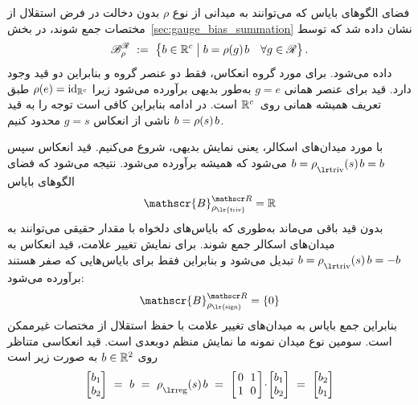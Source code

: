فضای الگوهای بایاس که می‌توانند به میدانی از نوع $\rho$ بدون دخالت در فرض استقلال از مختصات جمع شوند، در بخش~\ref{sec:gauge_bias_summation} نشان داده شد که توسط
\begin{align}
	\mathscr{B}^{\mathscr{R}}_\rho\ :=\ \big\{ b \in\mathbb{R}^c \;\big|\; b = \rho(g)\mkern2mu b\ \ \ \forall g\in \mathscr{R} \big\} \,.
\end{align}
داده می‌شود.
برای مورد گروه انعکاس، فقط دو عنصر گروه و بنابراین دو قید وجود دارد.
قید برای عنصر همانی $g=e$ به‌طور بدیهی برآورده می‌شود زیرا $\rho(e) = \mathrm{id}_{\mathbb{R}^c}$ طبق تعریف همیشه همانی روی~$\mathbb{R}^c$ است.
در ادامه بنابراین کافی است توجه را به قید $b = \rho(s)\mkern2mu b$ ناشی از انعکاس $g=s$ محدود کنیم.

با مورد میدان‌های اسکالر، یعنی نمایش بدیهی، شروع می‌کنیم.
قید انعکاس سپس $b = \rhotriv(s)\mkern2mu b = b$ می‌شود که همیشه برآورده می‌شود.
نتیجه می‌شود که فضای الگوهای بایاس
\begin{align}
	\mathscr{B}^{\Flip}_{\scalebox{.8}{$\rho_{{\textup{\lr{triv}}}}$}} = \R
\end{align}
بدون قید باقی می‌ماند به‌طوری که بایاس‌های دلخواه با مقدار حقیقی می‌توانند به میدان‌های اسکالر جمع شوند.
برای نمایش تغییر علامت، قید انعکاس به $b = \rhotriv(s)\, b = -b$ تبدیل می‌شود و بنابراین فقط برای بایاس‌هایی که صفر هستند برآورده می‌شود:
\begin{align}
	\mathscr{B}^{\Flip}_{\scalebox{.8}{$\rho_{{\textup{\lr{sign}}}}$}} = \{0\}
\end{align}
بنابراین جمع بایاس به میدان‌های تغییر علامت با حفظ استقلال از مختصات غیرممکن است.
سومین نوع میدان نمونه ما نمایش منظم دوبعدی است.
قید انعکاسی متناظر روی $b\in\mathbb{R}^2$ به صورت زیر است
\begin{align}
	\begin{bmatrix} b_1 \\ b_2 \end{bmatrix}
	\ =\ 
	b
	\ =\ 
	\rhoreg(s)\mkern2mu b
	\ =\ 
	\begin{bmatrix} \hspace{1.5pt}
		0 &\mkern-7mu 1 \hspace*{1.5pt} \\ \hspace{1.5pt} 1 &\mkern-7mu 0 \hspace*{1.5pt}
	\end{bmatrix}
	\!\cdot\! \begin{bmatrix} b_1 \\ b_2 \end{bmatrix}
	\ =\ 
	\begin{bmatrix} b_2 \\ b_1 \end{bmatrix}
\end{align}
